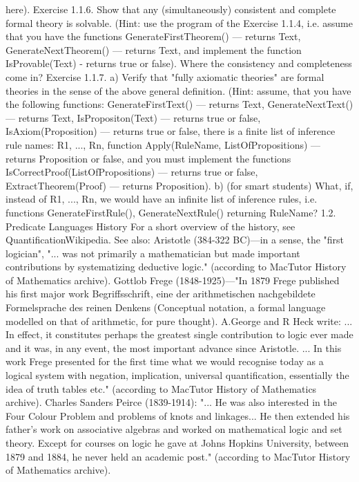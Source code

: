 here).
Exercise 1.1.6. Show that any (simultaneously) consistent and complete formal theory is solvable. (Hint:
use the program of the Exercise 1.1.4, i.e. assume that you have the functions GenerateFirstTheorem() ---
returns Text, GenerateNextTheorem() --- returns Text, and implement the function IsProvable(Text) -
returns true or false). Where the consistency and completeness come in?
Exercise 1.1.7. a) Verify that "fully axiomatic theories" are formal theories in the sense of the above
general definition. (Hint: assume, that you have the following functions: GenerateFirstText() --- returns
Text, GenerateNextText() --- returns Text, IsPropositon(Text) --- returns true or false, IsAxiom(Proposition) ---
returns true or false, there is a finite list of inference rule names: {R1, ..., Rn}, function Apply(RuleName,
ListOfPropositions) --- returns Proposition or false, and you must implement the functions
IsCorrectProof(ListOfPropositions) --- returns true or false, ExtractTheorem(Proof) --- returns Proposition).
b) (for smart students) What, if, instead of {R1, ..., Rn}, we would have an infinite list of inference rules,
i.e. functions GenerateFirstRule(), GenerateNextRule() returning RuleName?
1.2. Predicate Languages
History
For a short overview of the history, see QuantificationWikipedia.
See also:
Aristotle (384-322 BC)---in a sense, the "first logician", "... was not primarily a mathematician but made important
contributions by systematizing deductive logic." (according to MacTutor History of Mathematics archive).
Gottlob Frege (1848-1925)---"In 1879 Frege published his first major work Begriffsschrift, eine der arithmetischen
nachgebildete Formelsprache des reinen Denkens (Conceptual notation, a formal language modelled on that of arithmetic, for
pure thought). A.George and R Heck write: ... In effect, it constitutes perhaps the greatest single contribution to logic ever
made and it was, in any event, the most important advance since Aristotle. ... In this work Frege presented for the first time
what we would recognise today as a logical system with negation, implication, universal quantification, essentially the idea of
truth tables etc." (according to MacTutor History of Mathematics archive).
Charles Sanders Peirce (1839-1914): "... He was also interested in the Four Colour Problem and problems of knots and
linkages... He then extended his father's work on associative algebras and worked on mathematical logic and set theory. Except
for courses on logic he gave at Johns Hopkins University, between 1879 and 1884, he never held an academic post."
(according to MacTutor History of Mathematics archive).
